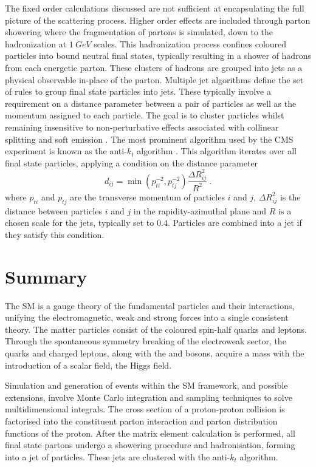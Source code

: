 The fixed order calculations discussed are not sufficient at encapsulating the full picture of the scattering process. Higher order effects are included through parton showering where the fragmentation of partons is simulated, down to the hadronization at $\SI{1}{GeV}$ scales. This hadronization process confines coloured particles into bound neutral final states, typically resulting in a shower of hadrons from each energetic parton. These clusters of hadrons are grouped into jets as a physical observable in-place of the parton. Multiple jet algorithms define the set of rules to group final state particles into jets. These typically involve a requirement on a distance parameter between a pair of particles as well as the momentum assigned to each particle. The goal is to cluster particles whilst remaining insensitive to non-perturbative effects associated with collinear splitting and soft emission \cite{Buckley:2011ms}. The most prominent algorithm used by the CMS experiment is known as the anti-$k_t$ algorithm \cite{Salam:2009jx}. This algorithm iterates over all final state particles, applying a condition on the distance parameter
%
\begin{equation}
    d_{ij} = \min\left(p_{ti}^{-2},p_{tj}^{-2}\right)\frac{\Delta R_{ij}^2}{R^2}\ .
\end{equation}
%
where $p_{ti}$ and $p_{tj}$ are the transverse momentum of particles $i$ and $j$, $\Delta R_{ij}^2$ is the distance between particles $i$ and $j$ in the rapidity-azimuthal plane and $R$ is a chosen scale for the jets, typically set to $0.4$. Particles are combined into a jet if they satisfy this condition.


\section{Summary}

The SM is a gauge theory of the fundamental particles and their interactions, unifying the electromagnetic, weak and strong forces into a single consistent theory. The matter particles consist of the coloured spin-half quarks and leptons. Through the spontaneous symmetry breaking of the electroweak sector, the quarks and charged leptons, along with the \PW and \PZ bosons, acquire a mass with the introduction of a scalar field, the Higgs field.

Simulation and generation of events within the SM framework, and possible extensions, involve Monte Carlo integration and sampling techniques to solve multidimensional integrals. The cross section of a proton-proton collision is factorised into the constituent parton interaction and parton distribution functions of the proton.  After the matrix element calculation is performed, all final state partons undergo a showering procedure and hadronisation, forming into a jet of particles. These jets are clustered with the anti-$k_t$ algorithm.
